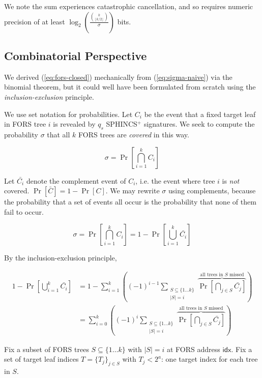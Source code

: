 \documentclass[11pt]{article}
\newcommand{\spx}{SPHINCS$^+$\xspace}
\begin{document}
We note the sum experiences catastrophic cancellation, and so requires numeric precision of at least $\log_2 \left( \frac{\binom{k}{\lfloor k/2 \rfloor}}{\sigma} \right)$ bits.

\subsection{Combinatorial Perspective}

We derived (\ref{eq:fors-closed}) mechanically from (\ref{eq:sigma-naive}) via the binomial theorem, but it could well have been formulated from scratch using the \emph{inclusion-exclusion} principle.

We use set notation for probabilities. Let $C_i$ be the event that a fixed target leaf in FORS tree $i$ is revealed by $q_s$ \spx signatures. We seek to compute the probability $\sigma$ that all $k$ FORS trees are \emph{covered} in this way.

\begin{equation}
  \sigma = \Pr \left[ \bigcap_{i=1}^{k} C_i \right]
\end{equation}

Let $\bar{C_i}$ denote the complement event of $C_i$, i.e. the event where tree $i$ is \emph{not} covered. $\Pr[\bar C] = 1 - \Pr[C]$. We may rewrite $\sigma$ using complements, because the probability that a set of events all occur is the probability that none of them fail to occur.

\begin{equation}
  \sigma = \Pr \left[ \bigcap_{i=1}^{k} C_i \right] = 1 - \Pr \left[ \bigcup_{i=1}^{k} \bar{C_i} \right]
\end{equation}

By the inclusion-exclusion principle,

\begin{align}
  1 - \Pr \left[ \bigcup_{i=1}^k \bar{C_i} \right]
    &= 1 - \sum_{i=1}^k \left( (-1)^{i-1} \sum_{\substack{S \subseteq \{1 \ldots k\} \\ |S|=i}} \overbrace{\Pr \left[ \bigcap_{j \in S} \bar{C_j} \right]}^{\text{all trees in $S$ missed}} \right) \\
    &= \sum_{i=0}^k \left( (-1)^{i} \sum_{\substack{S \subseteq \{1 \ldots k\} \\ |S|=i}} \overbrace{\Pr \left[ \bigcap_{j \in S} \bar{C_j} \right]}^{\text{all trees in $S$ missed}} \right)
\end{align}

Fix a subset of FORS trees $S \subseteq \{1 \ldots k\}$ with $|S| = i$ at FORS address $\mathsf{idx}$. Fix a set of target leaf indices $T = \{T_j\}_{j \in S}$ with $T_j < 2^a$: one target index for each tree in $S$.
\end{document}
